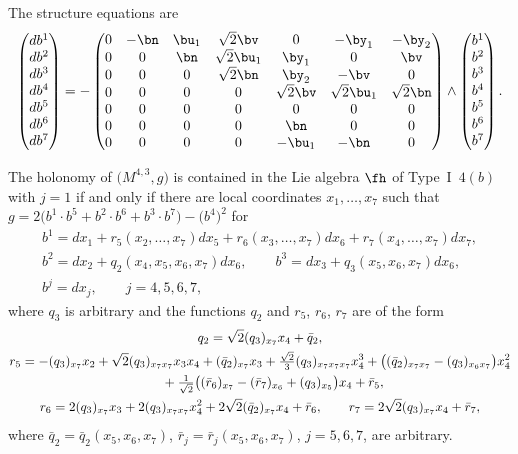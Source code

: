 The structure equations are
\begin{gather}\label{EI4(b)j=1}\left(\begin{matrix} db^1\\db^2\\db^3\\db^4\\db^5\\db^6\\db^7\end{matrix}\right) = -\left(
\begin{matrix}
0 &-\bn&\bu_1&\sqrt 2 \bv&0&-\by_1&-\by_2\\
0&0&\bn&\sqrt2 \bu_1&\by_1&0&\bv\\
0&0&0&\sqrt 2 \bn&\by_2&-\bv&0\\
0&0&0&0&\sqrt 2 \bv&\sqrt2 \bu_1&\sqrt 2 \bn\\
0&0&0&0&0&0&0\\
0&0&0&0&\bn&0&0\\
0&0&0&0&-\bu_1&-\bn&0
\end{matrix}\right) \wedge \left(\begin{matrix} b^1\\b^2\\b^3\\b^4\\b^5\\b^6\\b^7\end{matrix}\right).
\end{gather}
%
\begin{Proposition} The holonomy of $\big(M^{4,3},g\big)$ is contained in the Lie algebra $\fh$ of Type~I~$4(b)$ with $j=1$
if and only if there are local coordinates $x_1,\dots,x_7$ such that $g=2\big(b^1\cdot b^5+b^2\cdot b^6+b^3\cdot b^7\big)- \big(b^4\big)^2$ for
\begin{gather*}
b^1= dx_1 + r_5(x_2,\dots, x_7)dx_5+r_6(x_3,\dots,x_7)dx_6+r_7(x_4,\dots,x_7)dx_7, \nonumber \\
b^2= dx_2 +q_2(x_4,x_5,x_6,x_7) dx_6, \qquad
b^3= dx_3+q_3(x_5,x_6,x_7) dx_6 ,\\ %
b^j= dx_j, \qquad j=4,5,6,7,
\end{gather*}
where $q_3$ is arbitrary and the functions $q_2$ and $r_5$, $r_6$, $r_7$ are of the form
\begin{gather*}
q_2 = \sqrt2 (q_3)_{x_7}x_4 +\bar q_2,\\
r_5 = -(q_3)_{x_7}x_2+\sqrt2 (q_3)_{x_7 x_7}x_3 x_4+(\bar q_2)_{x_7}x_3+ \tfrac{\sqrt2}3(q_3)_{x_7 x_7 x_7}x_4^3+\big((\bar q_2)_{x_7 x_7}-(q_3)_{x_6 x_7}\big)x_4^2 \\
 \hphantom{r_5 =}{} + \tfrac1 {\sqrt2}\big((\bar r_6)_{x_7}-(\bar r_7)_{x_6}+(q_3)_{x_5}\big)x_4+\bar r_5, \\
r_6 = 2(q_3)_{x_7}x_3+2(q_3)_{x_7 x_7}x_4^2+2\sqrt2(\bar q_2)_{x_7} x_4+\bar r_6, \qquad
r_7 = 2\sqrt2 (q_3)_{x_7}x_4+\bar r_7,
\end{gather*}
where $\bar q_2=\bar q_2(x_5,x_6,x_7)$, $\bar r_j =\bar r_j (x_5,x_6,x_7)$, $j=5,6,7$, are arbitrary.
\end{Proposition}

